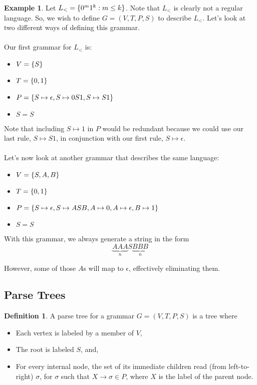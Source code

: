 \documentclass[]{article}
\DeclarePairedDelimiter{\set}{\lbrace}{\rbrace}
\theoremstyle{definition}
\newtheorem*{defn}{Definition}
\newtheorem{ex}{Example}[section]
\begin{document}
        \begin{ex}
          Let $L_< = \set{0^m 1^k : m \le k}$. Note that $L_<$ is clearly not a regular language. So, we wish to define $G = (V, T, P, S)$ to describe $L_<$. Let's look at two different ways of defining this grammar.
          \\ \\
          Our first grammar for $L_<$ is:
          \begin{itemize}
            \item $V = \set{S}$
            \item $T = \set{0, 1}$
            \item $P = \set{ S \mapsto \epsilon, S \mapsto 0S1, S \mapsto S1}$
            \item $S = S$
          \end{itemize}

          Note that including $S \mapsto 1$ in $P$ would be redundant because we could use our last rule, $S \mapsto S1$, in conjunction with our first rule, $S \mapsto \epsilon$.
          \\ \\
          Let's now look at another grammar that describes the same language:
          \begin{itemize}
            \item $V = \set{S, A, B}$
            \item $T = \set{0, 1}$
            \item $P = \set{S \mapsto \epsilon, S \mapsto ASB, A \mapsto 0, A \mapsto \epsilon, B \mapsto 1}$
            \item $S = S$
          \end{itemize}

          With this grammar, we always generate a string in the form
          $$
            \underbrace{AAA}_{n} S \underbrace{BBB}_{n}
          $$

          However, some of those $A$s will map to $\epsilon$, effectively eliminating them.
        \end{ex}

    \subsection{Parse Trees}
      \begin{defn}
        A parse tree for a grammar $G = (V, T, P, S)$ is a tree where
        \begin{itemize}
          \item Each vertex is labeled by a member of $V$,
          \item The root is labeled $S$, and,
          \item For every internal node, the set of its immediate children read (from left-to-right) $\sigma$, for $\sigma$ such that $X \to \sigma \in P$, where $X$ is the label of the parent node.
        \end{itemize}
      \end{defn}
\end{document}
